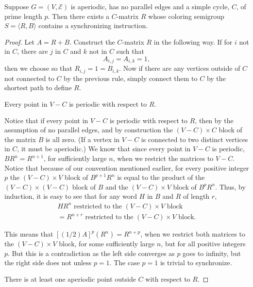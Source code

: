 \begin{theorem}		\label{thm:4.10}
Suppose $G=(V,\mathcal{E})$ is aperiodic, has no parallel edges and a simple
cycle, $C$, of prime length $p$. 
Then there exists a $C$-matrix $R$ whose coloring semigroup $S=\langle R,B\rangle$ contains a synchronizing instruction.
\end{theorem}

\begin{proof}
Let $A=R+B$. 
Construct the $C$-matrix $R$ in the following way. 
If for $i$ not in $C$, there are $j$ in $C$ and $k$ not in $C$ such that
\[
  A_{i,j}=A_{i,k}=1,
\]
then we choose so that $R_{i,j}=1=B_{i,k}$. 
Now if there are any vertices outside of $C$ not connected to $C$ by the 
previous rule, simply connect them to $C$ by the shortest path to define
$R$.

 Every point in $V-C$ is periodic with respect to $R$.

\vphantom{...}

Notice that if every point in $V-C$ is periodic with respect to $R$, then by
the assumption of no parallel edges, and by construction the $(V-C)\times C$ block of the matrix $B$ is all zero. 
(If a vertex in $V-C$ is connected to two distinct vertices in $C$, it must be aperiodic.) 
We know that since every point in $V-C$ is  periodic, $BR^n=R^{n+1}$, for 
sufficiently large $n$, when we restrict the matrices to $V-C$. 
Notice that because of our convention mentioned earlier, for every positive integer $p$ the $(V-C)\times V$ block of $B^{p+1}R^n$ is equal to the product of the $(V-C)\times (V-C)$ block of $B$ and the $(V-C)\times V$ block of $B^pR^n$. 
Thus, by induction, it is easy to see that for any word $H$ in $B$
and $R$ of length $r$,
\[
  \begin{gathered}
	HR^n\text{ restricted to the }(V-C)\times V\text{ block} \\
	=R^{n+r}\text{ restricted to the }(V-C)\times V\text{ block}. 
  \end{gathered}
\]

This means that $[(1/2)A]^p\left( R^n\right) = R^{n+p}$, when we restrict both matrices
to the $(V-C)\times V$ block, for some sufficiently large $n$, but for all positive integers $p$. 
But this is a contradiction as the left side converges as $p$ goes to 
infinity, but the right side does not unless $p=1$. 
The case $p=1$ is trivial to synchronize.

 There is at least one aperiodic point outside $C$ with
respect to $R$.


\end{proof}
